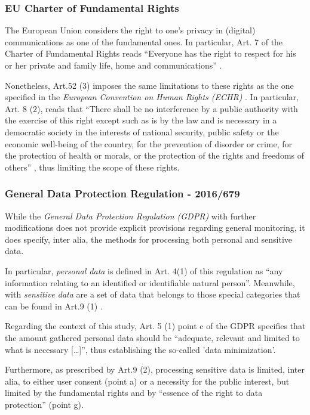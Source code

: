 \subsubsection{EU Charter of Fundamental Rights}

The European Union considers the right to one's privacy in (digital) communications as one of the fundamental ones. In particular, Art. 7 of the Charter of Fundamental Rights reads ``Everyone has the right to respect for his or her private and family life, home and communications'' \cite {eu_charter_fundamental_rights}. 

Nonetheless, Art.52 (3) imposes the same limitations to these rights as the one specified in the \textit{European Convention on Human Rights (ECHR)} \cite {eu_charter_fundamental_rights}. In particular, Art. 8 (2), reads that ``There shall be no interference by a public authority with the exercise of this right except such as is by the law and is necessary in a democratic society in the interests of national security, public safety or the economic well-being of the country, for the prevention of disorder or crime, for the protection of health or morals, or the protection of the rights and freedoms of others'' \cite {echr}, thus limiting the scope of these rights.

\subsubsection{General Data Protection Regulation - 2016/679}

While the \textit{General Data Protection Regulation (GDPR)} with further modifications does not provide explicit provisions regarding general monitoring, it does specify, inter alia, the methods for processing both personal and sensitive data.

In particular, \textit{personal data} is defined in Art. 4(1) of this regulation \cite{GDPR} as ``any information relating to an identified or identifiable natural person''. Meanwhile, with \textit{sensitive data} are a set of data that belongs to those special categories that can be found in Art.9 (1) \cite {GDPR}.

Regarding the context of this study, Art. 5 (1) point c of the GDPR \cite {GDPR} specifies that the amount gathered personal data should be ``adequate, relevant and limited to what is necessary [\dots]'', thus establishing the so-called 'data minimization'.

Furthermore, as prescribed by Art.9 (2), processing sensitive data is limited, inter alia, to either user consent (point a) or a necessity for the public interest, but limited by the fundamental rights and by ``essence of the right to data protection'' \cite {GDPR} (point g).

